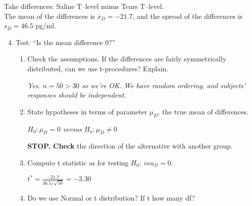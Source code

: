     Take differences: Saline T--level minus Tears T--level.\\
    The mean of the differences is  $\overline{x}_D = -21.7$, and
    the spread of the differences is  $s_D = 46.5$ pg/ml.
    \begin{enumerate}
  \setcounter{enumi}{3}
        \item Test: ``Is the mean difference 0?''
          \begin{enumerate}
            \item Check the assumptions. If the differences are
              fairly symmetrically distributed, can we use t-procedures?
              Explain. 
\begin{students}
    \vspace{2.8cm}    
\end{students}

\begin{key}
  {\it  Yes. $n=50 > 30$ so we're OK. We have random ordering, and 
     subjects' responses should be independent.} 
\end{key}

        \item State hypotheses in terms of parameter $\mu_D$, the
              true mean of differences.
\begin{students}
    \vspace{2cm}    
\end{students}

\begin{key}
  {\it  $H_0: \mu_D = 0$ versus $H_a: \mu_D \neq 0$}
\end{key}

    {\bf STOP.  Check} the direction of the alternative with another group.
    \item Compute t statistic as for  testing $H_0:\  mu_D=0$.
\begin{students}
    \vspace{1.5cm}    
\end{students}

\begin{key}
  {\it  $t^* = \frac{ -21.7}{46.5/\sqrt{50}} = -3.30 $}
\end{key}

            \item Do we use Normal  or t distribution? 
              If t how many df?
\begin{students}
    \vspace{1cm}    
\end{students}


\end{enumerate}
\end{enumerate}
